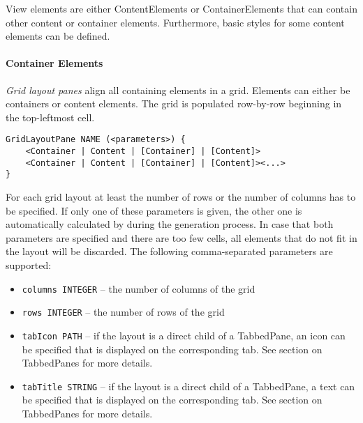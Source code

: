 
View elements are either ContentElements or ContainerElements that can contain other content or container elements. Furthermore, basic styles for some content elements can be defined.

\paragraph{Container Elements}

\textit{Grid layout panes} align all containing elements in a grid. Elements can either be containers or content elements. The grid is populated row-by-row beginning in the top-leftmost cell.

\begin{lstlisting}
GridLayoutPane NAME (<parameters>) {
	<Container | Content | [Container] | [Content]>
	<Container | Content | [Container] | [Content]><...>
}
\end{lstlisting}

For each grid layout at least the number of rows or the number of columns has to be specified. If only one of these parameters is given, the other one is automatically calculated by \MD during the generation process. In case that both parameters are specified and there are too few cells, all elements that do not fit in the layout will be discarded. The following comma-separated parameters are supported:
\begin{itemize}
\item \lstinline!columns INTEGER! -- the number of columns of the grid
\item \lstinline!rows INTEGER! -- the number of rows of the grid
\item \lstinline!tabIcon PATH! -- if the layout is a direct child of a TabbedPane, an icon can be specified that is displayed on the corresponding tab. See section on TabbedPanes for more details.
\item \lstinline!tabTitle STRING! -- if the layout is a direct child of a TabbedPane, a text can be specified that is displayed on the corresponding tab. See section on TabbedPanes for more details.
\end{itemize}

